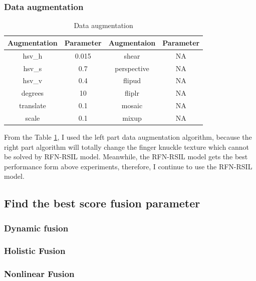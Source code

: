 \subsubsection{Data augmentation}
\begin{table}[h]
    \centering
    \caption{Data augmentation}
    \begin{tabular}{cccc}
    \hline
    Augmentation & Parameter & Augmentaion & Parameter \\ \hline
    hsv\_h       & 0.015     & shear       & NA        \\
    hsv\_s       & 0.7       & perspective & NA        \\
    hsv\_v       & 0.4       & flipud      & NA        \\
    degrees      & 10         & fliplr      & NA        \\
    translate    & 0.1       & mosaic      & NA        \\
    scale        & 0.1       & mixup       & NA        \\ \hline
    \end{tabular}
    \label{data-augmentation}
\end{table}
From the Table \ref{data-augmentation}, I used the left part data augmentation algorithm, because the right part algorithm will totally change the finger knuckle texture which cannot be solved by RFN-RSIL model. Meanwhile, the RFN-RSIL model gets the best performance form above experiments, therefore, I continue to use the RFN-RSIL model.

\subsection{Find the best score fusion parameter}
\subsubsection{Dynamic fusion}
\subsubsection{Holistic Fusion}
\subsubsection{Nonlinear Fusion}
